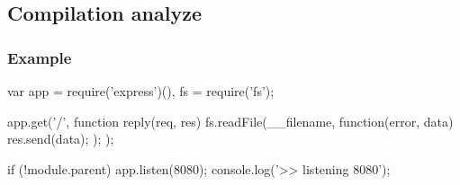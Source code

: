 

\subsection{Compilation analyze}

\subsubsection{Example}



\begin{code}[Javascript, caption={Source of the example},label={lst:exsource}]
var app = require('express')(),
    fs = require('fs');

app.get('/', function reply(req, res){
  fs.readFile(__filename, function(error, data) {
    res.send(data);
  });
});

if (!module.parent) {
    app.listen(8080);
    console.log('>> listening 8080');
}
\end{code}


